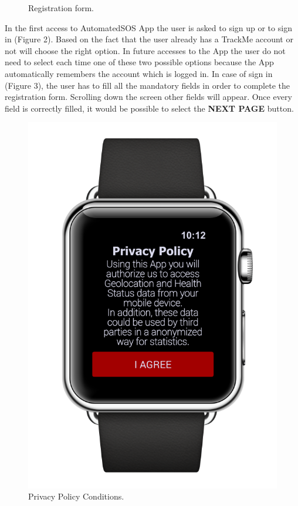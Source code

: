 \begin{enumerate}
\begin{figure}[H]
\begin{center}
\begin{minipage}[c]{.40\textwidth}
          	\caption{Registration form.}
        \end{minipage}
      \end{center}
\end{figure}
In the first access to AutomatedSOS App the user is asked to sign up or to sign in 			(Figure 2). Based on the fact that the user already has a TrackMe account or not will choose the right option. In future accesses to the App the user do not need to select each time one of these two possible options because the App automatically remembers the account which is logged in. In case of sign in (Figure 3), the user has to fill all the mandatory fields in order to complete the registration form. Scrolling down the screen other fields will appear. Once every field is correctly filled, it would be possible to select the \textbf{NEXT PAGE} button. 
\clearpage
\begin{figure}[H]
\begin{center}
        \begin{minipage}[c]{.40\textwidth}
        \centering
          \includegraphics[height=12 cm]{Images/Mockups/AutomatedSOSMockup2.png}
             	\caption{Privacy Policy Conditions.}
        \end{minipage}%
        \hspace{10mm}%
        \begin{minipage}[c]{.40\textwidth}
        \centering

\end{minipage}
\end{center}
\end{figure}
\end{enumerate}
